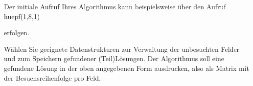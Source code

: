 \documentclass{lehramt-informatik-minimal}
\begin{document}
Der initiale Aufruf Ihres Algorithmus kann beispielsweise über den Aufruf
huepf(1,8,1)

erfolgen.

Wählen Sie geeignete Datenstrukturen zur Verwaltung der unbesuchten
Felder und zum Speichern gefundener (Teil)Lösungen. Der Algorithmus soll
eine gefundene Lösung in der oben angegebenen Form ausdrucken, also als
Matrix mit der Besuchsreihenfolge pro Feld.
\end{document}
